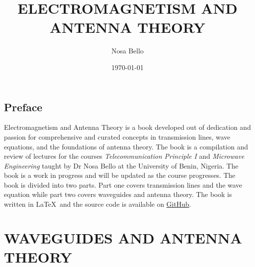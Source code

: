 \documentclass[a4paper,10pt, two column]{book}
\begin{document}
\author{Nosa Bello}
\title{ELECTROMAGNETISM AND ANTENNA THEORY}
\date{\today}

\frontmatter
\maketitle
\tableofcontents

\chapter{Preface}
Electromagnetism and Antenna Theory is a book developed out of dedication and passion for comprehensive and curated concepts in transmission lines, wave equations, and the foundations of antenna theory. The book is a compilation and review of lectures for the courses \textit{Telecommunication Principle I} and \textit{Microwave Engineering} taught by Dr Nosa Bello at the University of Benin, Nigeria. The book is a work in progress and will be updated as the course progresses. The book is divided into two parts. Part one covers transmission lines and the wave equation while part two covers waveguides and antenna theory. The book is written in \LaTeX\ and the source code is available on \href{https://github.com/allisonoge/electromagnetism-and-antenna-theory-v2.git}{GitHub}.

\mainmatter

\part{WAVEGUIDES AND ANTENNA THEORY}

% 
% 
% 
% 
% 
% 
% 
% 


% 
% 
% 

















\backmatter
\printindex

\shipoutAnswer
\end{document}
